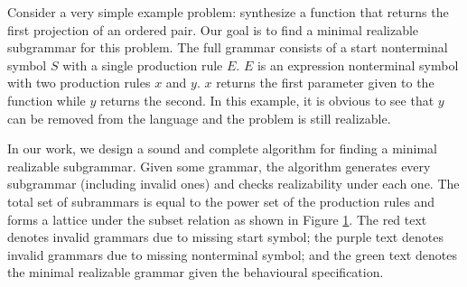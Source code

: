 \documentclass[acmsmall, nonacm]{acmart}
\begin{document}
\begin{figure}
  \label{fig:lattice}
\end{figure}

Consider a very simple example problem: synthesize a function that returns the first projection of an ordered pair. Our goal is to find a minimal realizable subgrammar for this problem. The full grammar consists of a start nonterminal symbol $S$ with a single production rule $E$. $E$ is an expression nonterminal symbol with two production rules $x$ and $y$. $x$ returns the first parameter given to the function while $y$ returns the second. In this example, it is obvious to see that $y$ can be removed from the language and the problem is still realizable.

In our work, we design a sound and complete algorithm for finding a minimal realizable subgrammar. Given some grammar, the algorithm generates every subgrammar (including invalid ones) and checks realizability under each one. The total set of subrammars is equal to the power set of the production rules and forms a lattice under the subset relation as shown in Figure \ref{fig:lattice}. The red text denotes invalid grammars due to missing start symbol; the purple text denotes invalid grammars due to missing nonterminal symbol; and the green text denotes the minimal realizable grammar given the behavioural specification.
\end{document}

